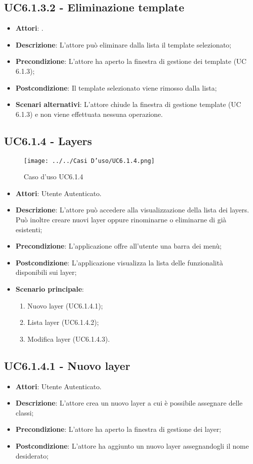 \subsection{UC6.1.3.2 - Eliminazione template} 
\label{ssec:UC6.1.3.2} 
\begin{itemize} 
\item \textbf{Attori}: .
\item \textbf{Descrizione}: L'attore può eliminare dalla lista il template selezionato;
\item \textbf{Precondizione}: L'attore ha aperto la finestra di gestione dei template (UC 6.1.3);
\item \textbf{Postcondizione}: Il template selezionato viene rimosso dalla lista;
\item \textbf{Scenari alternativi}: L'attore chiude la finestra di gestione template (UC 6.1.3) e non viene effettuata nessuna operazione.
\end{itemize} 
\subsection{UC6.1.4 - Layers} 
\label{ssec:UC6.1.4} 
\begin{figure}[h!] 
\centering 
\texttt{[image: ../../Casi D'uso/UC6.1.4.png]} 
\caption{Caso d'uso UC6.1.4} 
 \end{figure} 
\begin{itemize} 
\item \textbf{Attori}: Utente Autenticato.
\item \textbf{Descrizione}: L’attore  può accedere alla visualizzazione della lista dei layers. Può inoltre creare nuovi layer oppure rinominarne o eliminarne di già esistenti;
\item \textbf{Precondizione}: L’applicazione offre all’utente una barra dei menù;
\item \textbf{Postcondizione}: L'applicazione visualizza la lista delle funzionalità disponibili sui layer;
\item \textbf{Scenario principale}: \begin{enumerate}\item Nuovo layer (UC6.1.4.1);\item Lista layer (UC6.1.4.2);\item Modifica layer (UC6.1.4.3). 
 \end{enumerate}
\end{itemize} 
\subsection{UC6.1.4.1 - Nuovo layer} 
\label{ssec:UC6.1.4.1} 
\begin{itemize} 
\item \textbf{Attori}: Utente Autenticato.
\item \textbf{Descrizione}: L'attore crea un nuovo layer a cui è possibile assegnare delle classi;
\item \textbf{Precondizione}: L'attore ha aperto la finestra di gestione dei layer;
\item \textbf{Postcondizione}: L'attore ha aggiunto un nuovo layer assegnandogli il nome desiderato;
\end{itemize} 
